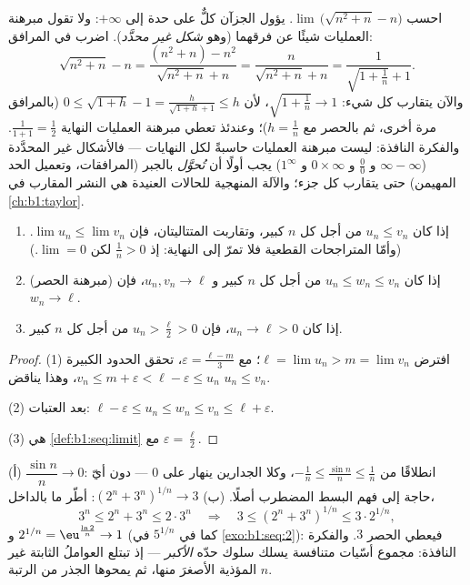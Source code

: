 \begin{example}\label{ex:b1:seq:conjugatetrick}
احسب $\lim\,\bigl(\sqrt{n^2 + n} - n\bigr)$. يؤول الجزآن
كلٌّ على حدة إلى $+\infty$: ولا تقول مبرهنة العمليات شيئًا
عن فرقهما (وهو \emph{شكل غير محدَّد}). اضرب
في المرافق:
\[
\sqrt{n^2 + n} - n
= \frac{(n^2 + n) - n^2}{\sqrt{n^2 + n} + n}
= \frac{n}{\sqrt{n^2+n} + n}
= \frac{1}{\sqrt{1 + \frac1n} + 1} .
\]
والآن يتقارب كل شيء: $\sqrt{1 + \frac1n} \to 1$، لأن
$0 \leq \sqrt{1 + h} - 1 = \frac{h}{\sqrt{1+h} + 1} \leq h$
(بالمرافق مرة أخرى، ثم بالحصر مع $h = \frac1n$)؛ وعندئذ
تعطي مبرهنة العمليات النهاية $\frac{1}{1 + 1} =
\frac12$. والفكرة النافذة: ليست مبرهنة العمليات
حاسبةً لكل النهايات --- فالأشكال غير المحدَّدة ($\infty -
\infty$ و $\frac00$ و $0 \times \infty$ و $1^\infty$) يجب أولًا أن
\emph{تُحوَّل} بالجبر (المرافقات، وتعميل الحد
المهيمن) حتى يتقارب كل جزء؛ والآلة المنهجية للحالات
العنيدة هي النشر المقارب في
\cref{ch:b1:taylor}.
\end{example}

\begin{theorem}\label{thm:b1:seq:order}
\begin{enumerate}
  \item إذا كان $u_n \leq v_n$ من أجل كل $n$ كبير، وتقاربت المتتاليتان، فإن
        $\lim u_n \leq \lim v_n$. (وأمّا المتراجحات القطعية فلا
        تمرّ إلى النهاية: إذ $\frac 1n > 0$ لكن $\lim = 0$.)
  \item (مبرهنة الحصر) إذا كان $u_n \leq w_n
        \leq v_n$ من أجل كل $n$ كبير و $u_n, v_n \to \ell$، فإن
        $w_n \to \ell$.
  \item إذا كان $u_n \to \ell > 0$، فإن $u_n > \frac\ell2 > 0$ من أجل كل
        $n$ كبير.
\end{enumerate}
\end{theorem}

\begin{proof}
(1) افترض $\ell = \lim u_n > m = \lim v_n$؛ مع $\varepsilon =
\frac{\ell - m}{3}$، تحقق الحدود الكبيرة $v_n \leq m + \varepsilon <
\ell - \varepsilon \leq u_n$، وهذا يناقض $u_n \leq v_n$.

(2) بعد العتبات: $\ell - \varepsilon \leq u_n \leq w_n \leq
v_n \leq \ell + \varepsilon$.

(3) هي \cref{def:b1:seq:limit} مع $\varepsilon = \frac\ell2$.
\end{proof}

\begin{example}[حصران]\label{ex:b1:seq:squeezes}
(أ) $\dfrac{\sin n}{n} \to 0$: انطلاقًا من $-\frac1n \leq \frac{\sin
n}{n} \leq \frac1n$، وكلا الجدارين ينهار على $0$ --- دون أيّ حاجة إلى
فهم البسط المضطرب أصلًا. (ب) $(2^n +
3^n)^{1/n} \to 3$: أطّر ما بالداخل،
\[
3^n \leq 2^n + 3^n \leq 2\cdot3^n
\quad\Longrightarrow\quad
3 \leq (2^n + 3^n)^{1/n} \leq 3\cdot 2^{1/n} ,
\]
و $2^{1/n} = \eu^{\frac{\ln 2}{n}} \to 1$ (كما في $5^{1/n}$ في
\cref{exo:b1:seq:2}): فيعطي الحصر $3$. والفكرة
النافذة: مجموع أسّيات متنافسة يسلك سلوك حدّه
\emph{الأكبر} --- إذ تبتلع العواملُ الثابتة غير المؤذية
الأصغرَ منها، ثم يمحوها الجذر من الرتبة $n$.
\end{example}

